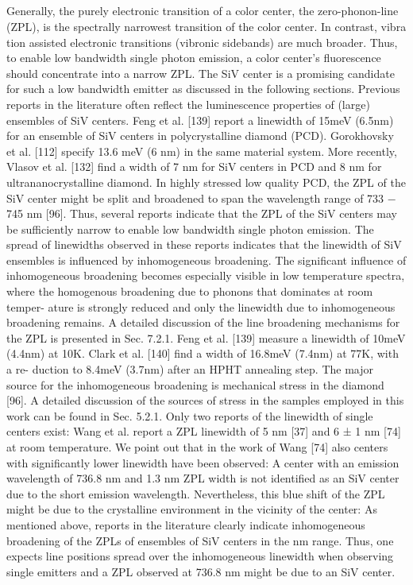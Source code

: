     \subsection{\zpl}

      Generally, the purely electronic transition of a color center, the zero-phonon-line (ZPL), is the spectrally narrowest transition of the color center. In contrast, vibra
      tion assisted electronic transitions (vibronic sidebands) are much broader. Thus, to enable low bandwidth single photon emission, a color center’s fluorescence should concentrate into a narrow ZPL. The SiV center is a promising candidate for such a low bandwidth emitter as discussed in the following sections.
      Previous reports in the literature often reflect the luminescence properties of (large) ensembles of SiV centers. Feng et al. [139] report a linewidth of 15meV (6.5nm) for an ensemble of SiV centers in polycrystalline diamond (PCD). Gorokhovsky et al. [112] specify 13.6 meV (6 nm) in the same material system. More recently, Vlasov et al. [132] find a width of 7 nm for SiV centers in PCD and 8 nm for ultrananocrystalline diamond. In highly stressed low quality PCD, the ZPL of the SiV center might be split and broadened to span the wavelength range of 733 − 745 nm [96]. Thus, several reports indicate that the ZPL of the SiV centers may be sufficiently narrow to enable low bandwidth single photon emission. The spread of linewidths observed in these reports indicates that the linewidth of SiV ensembles is influenced by inhomogeneous broadening. The significant influence of inhomogeneous broadening becomes especially visible in low temperature spectra, where the homogenous broadening due to phonons that dominates at room temper- ature is strongly reduced and only the linewidth due to inhomogeneous broadening remains. A detailed discussion of the line broadening mechanisms for the ZPL is presented in Sec. 7.2.1. Feng et al. [139] measure a linewidth of 10meV (4.4nm) at 10K. Clark et al. [140] find a width of 16.8meV (7.4nm) at 77K, with a re- duction to 8.4meV (3.7nm) after an HPHT annealing step. The major source for the inhomogeneous broadening is mechanical stress in the diamond [96]. A detailed discussion of the sources of stress in the samples employed in this work can be found in Sec. 5.2.1.
      Only two reports of the linewidth of single centers exist: Wang et al. report a ZPL linewidth of 5 nm [37] and 6 ± 1 nm [74] at room temperature. We point out that in the work of Wang [74] also centers with significantly lower linewidth have been observed: A center with an emission wavelength of 736.8 nm and 1.3 nm ZPL width is not identified as an SiV center due to the short emission wavelength. Nevertheless, this blue shift of the ZPL might be due to the crystalline environment in the vicinity of the center: As mentioned above, reports in the literature clearly indicate inhomogeneous broadening of the ZPLs of ensembles of SiV centers in the nm range. Thus, one expects line positions spread over the inhomogeneous linewidth when observing single emitters and a ZPL observed at 736.8 nm might be due to an SiV center.
